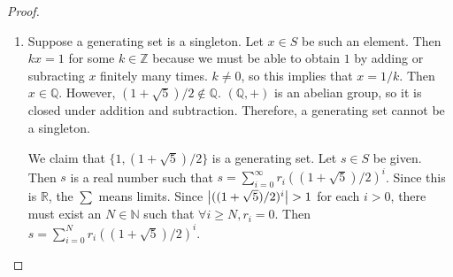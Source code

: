 \documentclass[12pt, psamsfonts]{amsart}
\theoremstyle{definition}
\theoremstyle{remark}
\numberwithin{equation}{section}
\begin{document}
\begin{proof}
  $ $
  \begin{enumerate}
    \item 
      Suppose a generating set is a singleton.
      Let $x \in S$ be such an element.
      Then $kx = 1$ for some $k \in \mathbb{Z}$ because we must be able to obtain $1$ by adding or subracting $x$ finitely many times.
      $k \ne 0$, so this implies that $x = 1 / k$.
      Then $x \in \mathbb{Q}$.
      However, $(1 + \sqrt{5}) / 2 \notin \mathbb{Q}$.
      $(\mathbb{Q}, +)$ is an abelian group, so it is closed under addition and subtraction.
      Therefore, a generating set cannot be a singleton.

      We claim that $\{ 1, (1 + \sqrt{5}) / 2 \}$ is a generating set.
      Let $s \in S$ be given.
      Then $s$ is a real number such that $s = \sum_{i=0}^{\infty} r_i((1 + \sqrt{5}) / 2)^i$.
      Since this is $\mathbb{R}$, the $\sum$ means limits.
      Since $\abs{((1 + \sqrt{5}) / 2)^i} > 1$ for each $i > 0$, there must exist an $N \in \mathbb{N}$ such that $\forall i \geq N, r_i = 0$.
      Then $s = \sum_{i=0}^{N} r_i((1 + \sqrt{5}) / 2)^i$.


\end{enumerate}
\end{proof}
\end{document}

